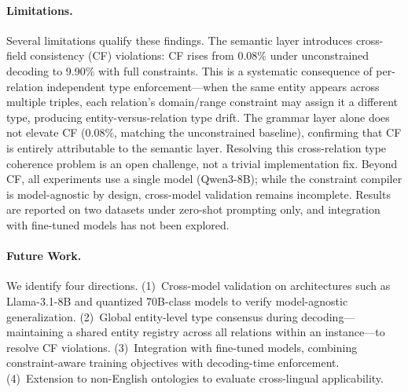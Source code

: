 \paragraph{Limitations.}
Several limitations qualify these findings.
The semantic layer introduces cross-field consistency (CF) violations: CF rises from 0.08\% under unconstrained decoding to 9.90\% with full constraints. %
This is a systematic consequence of per-relation independent type enforcement---when the same entity appears across multiple triples, each relation's domain/range constraint may assign it a different type, producing entity-versus-relation type drift.
The grammar layer alone does not elevate CF (0.08\%, matching the unconstrained baseline), confirming that CF is entirely attributable to the semantic layer. %
Resolving this cross-relation type coherence problem is an open challenge, not a trivial implementation fix.
Beyond CF, all experiments use a single model (Qwen3-8B); while the constraint compiler is model-agnostic by design, cross-model validation remains incomplete.
Results are reported on two datasets under zero-shot prompting only, and integration with fine-tuned models has not been explored.

\paragraph{Future Work.}
We identify four directions.
(1)~Cross-model validation on architectures such as Llama-3.1-8B and quantized 70B-class models to verify model-agnostic generalization.
(2)~Global entity-level type consensus during decoding---maintaining a shared entity registry across all relations within an instance---to resolve CF violations.
(3)~Integration with fine-tuned models, combining constraint-aware training objectives with decoding-time enforcement.
(4)~Extension to non-English ontologies to evaluate cross-lingual applicability.
